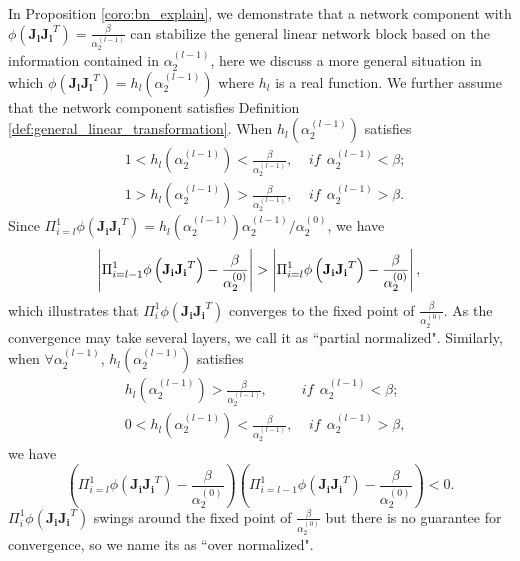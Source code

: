 \documentclass[10pt,journal,compsoc]{IEEEtran}
\begin{document}
In Proposition \ref{coro:bn_explain}, we demonstrate that a network component with $\phi(\mathbf{J_lJ_l}^T)=\frac{\beta}{\alpha_2^{(l-1)}}$ can stabilize the general linear network block based on the information contained in $\alpha_2^{(l-1)}$, here we discuss a more general situation in which $\phi(\mathbf{J_lJ_l}^T)=h_l(\alpha_2^{(l-1)})$ where $h_l$ is a real function. We further assume that 
the network component satisfies Definition \ref{def:general_linear_transformation}. 
When $h_l(\alpha_2^{(l-1)})$ satisfies
\begin{equation}
\begin{split}
    & 1<h_l(\alpha_2^{(l-1)})<\frac{\beta}{\alpha_2^{(l-1)}},~~~~~if~~\alpha_2^{(l-1)}<\beta;\\
    & 1>h_l(\alpha_2^{(l-1)})>\frac{\beta}{\alpha_2^{(l-1)}},~~~~~if~~\alpha_2^{(l-1)}>\beta.
\end{split}
\label{equ:partial_norm_def}
\end{equation}
Since $\Pi_{i=l}^1\phi(\mathbf{J_iJ_i}^T) = h_l(\alpha_2^{(l-1)})\alpha_2^{(l-1)}/\alpha_2^{(0)}$, we have
\begin{equation}
    \left|\Pi_{i=l-1}^1\phi\left(\mathbf{J_iJ_i}^T\right)-\frac{\beta}{\alpha_2^{(0)}}\right|>\left|\Pi_{i=l}^1\phi\left(\mathbf{J_iJ_i}^T\right)-\frac{\beta}{\alpha_2^{(0)}}\right|,\\
\label{equ:partial_norm}
\end{equation}
which illustrates that $\Pi_{i}^1\phi(\mathbf{J_iJ_i}^T)$ converges to the fixed point of $\frac{\beta}{\alpha_2^{(0)}}$. As the convergence may take several layers, we call it as ``partial normalized". Similarly, when $\forall \alpha_2^{(l-1)}$, $h_l(\alpha_2^{(l-1)})$ satisfies
\begin{equation}
\begin{split}
    & h_l(\alpha_2^{(l-1)})>\frac{\beta}{\alpha_2^{(l-1)}},~~~~~~~~~~~if~~\alpha_2^{(l-1)}<\beta;\\
    & 0<h_l(\alpha_2^{(l-1)})<\frac{\beta}{\alpha_2^{(l-1)}},~~~~~if~~\alpha_2^{(l-1)}>\beta,
\end{split}
\label{equ:over_norm_def}
\end{equation}
we have 
\begin{equation}
    \left(\Pi_{i=l}^1\phi\left(\mathbf{J_iJ_i}^T\right)-\frac{\beta}{\alpha_2^{(0)}}\right)\left(\Pi_{i=l-1}^1\phi\left(\mathbf{J_iJ_i}^T\right)-\frac{\beta}{\alpha_2^{(0)}}\right)<0.
\end{equation}
$\Pi_{i}^1\phi(\mathbf{J_iJ_i}^T)$ swings around the fixed point of $\frac{\beta}{\alpha_2^{(0)}}$ but there is no guarantee for convergence, so we name its as ``over normalized".
\end{document}

